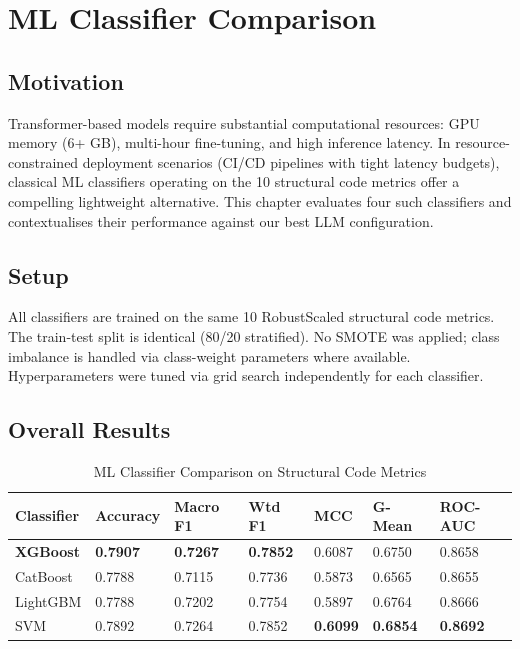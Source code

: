 \documentclass[12pt, a4paper]{report}
\begin{document}
\clearpage
\chapter{ML Classifier Comparison}

\section{Motivation}

Transformer-based models require substantial computational resources: GPU memory (6+ GB), multi-hour fine-tuning, and high inference latency. In resource-constrained deployment scenarios (CI/CD pipelines with tight latency budgets), classical ML classifiers operating on the 10 structural code metrics offer a compelling lightweight alternative. This chapter evaluates four such classifiers and contextualises their performance against our best LLM configuration.

\section{Setup}

All classifiers are trained on the same 10 RobustScaled structural code metrics. The train-test split is identical (80/20 stratified). No SMOTE was applied; class imbalance is handled via class-weight parameters where available. Hyperparameters were tuned via grid search independently for each classifier.

\section{Overall Results}

\begin{table}[H]
\centering
\caption{ML Classifier Comparison on Structural Code Metrics}
\label{tab:ml_results}
\begin{tabular}{L{2.5cm} C{1.8cm} C{1.8cm} C{1.8cm} C{1.5cm} C{1.8cm} C{2cm}}
\toprule
\textbf{Classifier} & \textbf{Accuracy} & \textbf{Macro F1} & \textbf{Wtd F1} & \textbf{MCC} & \textbf{G-Mean} & \textbf{ROC-AUC} \\
\midrule
\textbf{XGBoost}  & \textbf{0.7907} & \textbf{0.7267} & \textbf{0.7852} & 0.6087 & 0.6750 & 0.8658 \\
CatBoost          & 0.7788 & 0.7115 & 0.7736 & 0.5873 & 0.6565 & 0.8655 \\
LightGBM          & 0.7788 & 0.7202 & 0.7754 & 0.5897 & 0.6764 & 0.8666 \\
SVM               & 0.7892 & 0.7264 & 0.7852 & \textbf{0.6099} & \textbf{0.6854} & \textbf{0.8692} \\
\bottomrule
\end{tabular}
\end{table}
\end{document}
